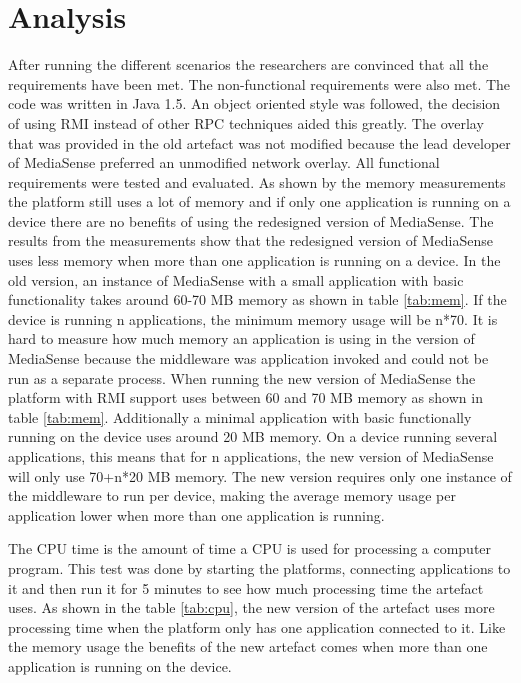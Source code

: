 \section{Analysis}
After running the different scenarios the researchers are convinced that all the requirements have been met. The non-functional requirements were also met. The code was written in Java 1.5. An object oriented style was followed, the decision of using RMI instead of other RPC techniques aided this greatly. The overlay that was provided in the old artefact was not modified because the lead developer of MediaSense preferred an unmodified network overlay. All functional requirements were tested and evaluated. As shown by the memory measurements the platform still uses a lot of memory and if only one application is running on a device there are no benefits of using the redesigned version of MediaSense. The results from the measurements show that the redesigned version of MediaSense uses less memory when more than one application is running on a device. In the old version, an instance of MediaSense with a small application with basic functionality takes around 60-70 MB memory as shown in table \ref{tab:mem}. If the device is running n applications, the minimum memory usage will be n*70. It is hard to measure how much memory an application is using in the version of MediaSense because the middleware was application invoked and could not be run as a separate process. When running the new version of MediaSense the platform with RMI support uses between 60 and 70 MB memory as shown in table \ref{tab:mem}. Additionally a minimal application with basic functionally running on the device uses around 20 MB memory. On a device running several applications, this means that for n applications, the new version of MediaSense will only use 70+n*20 MB memory. The new version requires only one instance of the middleware to run per device, making the average memory usage per application lower when more than one application is running.

The CPU time is the amount of time a CPU is used for processing a computer program. This test was done by starting the platforms, connecting applications to it and then run it for 5 minutes to see how much processing time the artefact uses. As shown in the table \ref{tab:cpu}, the new version of the artefact uses more processing time when the platform only has one application connected to it. Like the memory usage the benefits of the new artefact comes when more than one application is running on the device. 

